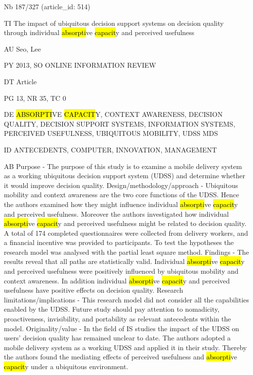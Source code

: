 \documentclass[a4paper]{article}
\begin{document}
\vspace*{-2cm}
Nb \tabto{0cm}187/327 (article\_id: 514)\par
TI \tabto{0cm}The impact of ubiquitous decision support systems on decision quality through individual \hl{absorpti}ve \hl{capacit}y and perceived usefulness\par
AU \tabto{0cm}Seo, Lee\par
PY \tabto{0cm}2013, SO ONLINE INFORMATION REVIEW\par
DT \tabto{0cm}Article\par
PG \tabto{0cm}13, NR 35, TC 0\par
DE \tabto{0cm}\hl{ABSORPTI}VE \hl{CAPACIT}Y, CONTEXT AWARENESS, DECISION QUALITY, DECISION SUPPORT SYSTEMS, INFORMATION SYSTEMS, PERCEIVED USEFULNESS, UBIQUITOUS MOBILITY, UDSS MDS\par
ID \tabto{0cm}ANTECEDENTS, COMPUTER, INNOVATION, MANAGEMENT\par
AB \tabto{0cm}Purpose - The purpose of this study is to examine a mobile delivery system as a working ubiquitous decision support system (UDSS) and determine whether it would improve decision quality.
Design/methodology/approach - Ubiquitous mobility and context awareness are the two core functions of the UDSS. Hence the authors examined how they might influence individual \hl{absorpti}ve \hl{capacit}y and perceived usefulness. Moreover the authors investigated how individual \hl{absorpti}ve \hl{capacit}y and perceived usefulness might be related to decision quality. A total of 174 completed questionnaires were collected from delivery workers, and a financial incentive was provided to participants. To test the hypotheses the research model was analysed with the partial least square method.
Findings - The results reveal that all paths are statistically valid. Individual \hl{absorpti}ve \hl{capacit}y and perceived usefulness were positively influenced by ubiquitous mobility and context awareness. In addition individual \hl{absorpti}ve \hl{capacit}y and perceived usefulness have positive effects on decision quality.
Research limitations/implications - This research model did not consider all the capabilities enabled by the UDSS. Future study should pay attention to nomadicity, proactiveness, invisibility, and portability as relevant antecedents within the model.
Originality/value - In the field of IS studies the impact of the UDSS on users' decision quality has remained unclear to date. The authors adopted a mobile delivery system as a working UDSS and applied it in their study. Thereby the authors found the mediating effects of perceived usefulness and \hl{absorpti}ve \hl{capacit}y under a ubiquitous environment.\par
\clearpage
\end{document}
